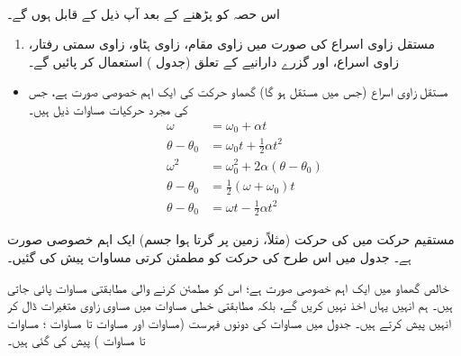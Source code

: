 \\
اس حصہ کو پڑھنے کے بعد آپ ذیل کے قابل ہوں گے۔
\begin{enumerate}[1.]
\item
مستقل زاوی اسراع کی صورت میں زاوی مقام، زاوی ہٹاو، زاوی سمتی رفتار، زاوی اسراع، اور  گزرے دارانیے کے   تعلق  (جدول ) استعمال کر پائیں گے۔
\end{enumerate}

\begin{itemize}
\item
مستقل زاوی اسراع  (جس میں    مستقل ہو گا) گھماو حرکت کی ایک اہم   خصوصی صورت ہے، جس کی مجرد حرکیات  مساوات  ذیل ہیں۔
\begin{align*}
\omega&=\omega_0+\alpha t\\
\theta-\theta_0&=\omega_0 t+\frac{1}{2}\alpha t^2\\
\omega^2&=\omega_0^2+2\alpha(\theta-\theta_0)\\
\theta-\theta_0&=\frac{1}{2}(\omega+\omega_0)t\\
\theta-\theta_0&=\omega t-\frac{1}{2}\alpha t^2
\end{align*}
\end{itemize}

مستقیم حرکت  میں   کی حرکت (مثلاً، زمین پر گرتا ہوا جسم) ایک اہم خصوصی صورت ہے۔ جدول  میں  اس طرح کی حرکت  کو مطمئن کرتی مساوات پیش کی گئیں۔

خالص گھماو میں   ایک اہم خصوصی صورت ہے؛ اس   کو مطمئن کرنے  والی مطابقتی  مساوات  پائی جاتی ہیں۔ ہم انہیں یہاں اخذ نہیں کریں گے، بلکہ مطابقتی خطی مساوات میں  مساوی زاوی متغیرات ڈال کر انہیں پیش کرتے ہیں۔ جدول  میں مساوات کی دونوں فہرست (مساوات  اور مساوات  تا مساوات ؛ مساوات  تا مساوات ) پیش کی گئی ہیں۔

